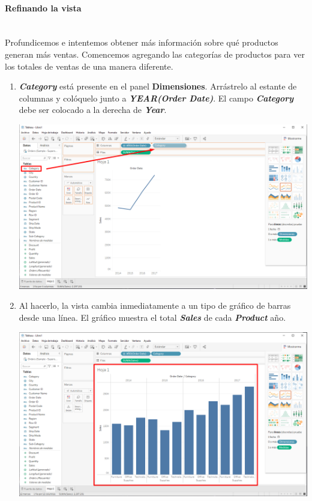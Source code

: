 \documentclass[12pt,letterpaper]{article}
\begin{document}
    \paragraph{\large Refinando la vista\\ \\}
    Profundicemos e intentemos obtener más información sobre qué productos generan más ventas. Comencemos agregando las categorías de productos para ver los totales de ventas de una manera diferente.
    \begin{enumerate}
        \item \textit{\textbf{Category}} está presente en el panel \textbf{Dimensiones}. Arrástrelo al estante de columnas y colóquelo junto a \textit{\textbf{YEAR(Order Date)}}. El campo \textit{\textbf{Category}} debe ser colocado a la derecha de \textit{\textbf{Year}}.
        \begin{center}
            \includegraphics[width=15cm]{./img/img12.png}
        \end{center}
        \item Al hacerlo, la vista cambia inmediatamente a un tipo de gráfico de barras desde una línea. El gráfico muestra el total \textit{\textbf{Sales}} de cada \textit{\textbf{Product}} año.
        \begin{center}
            \includegraphics[width=15cm]{./img/img13.png}

\end{center}
\end{enumerate}
\end{document}
